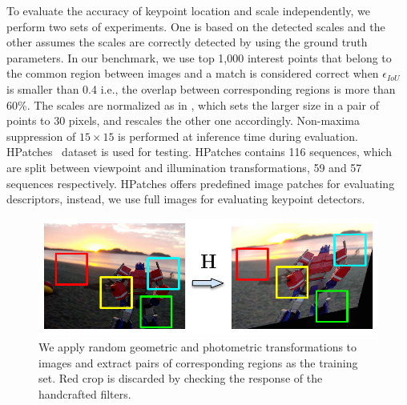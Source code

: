 To evaluate the accuracy of keypoint location and scale independently, we perform two sets of experiments. One is based on the detected scales and the other assumes the scales are correctly detected by using the ground truth parameters. 
In our benchmark, we use top 1,000 interest points that belong to the common region between images and a match is considered correct when $\epsilon_{IoU}$ is smaller than 0.4 i.e., the overlap between corresponding regions is more than 60\%. The scales are normalized as in \cite{Karel_Vedaldi_BMVC_18}, which sets the larger size in a pair of points to 30 pixels, and rescales the other one accordingly. Non-maxima suppression of $15 \times 15$ is performed at inference time during evaluation. HPatches~\cite{HPatches} dataset is used for testing. HPatches contains 116 sequences, which are split between viewpoint and illumination transformations, 59 and 57 sequences respectively. HPatches offers predefined image patches for evaluating descriptors, instead, we use full images for evaluating keypoint detectors. 

\begin{figure}[t]
 \hspace*{-0.1cm} 
 \vspace{-0.4cm}
    \centering
    \includegraphics[scale=0.75]{main/chapter02/figures/dataset_v3.pdf}
    \vspace{-0.0cm}
    \caption{We apply random geometric and photometric transformations to images and extract pairs of corresponding regions as the training set. 
    Red crop is discarded by checking the response of the handcrafted filters.
    }
    \label{fig:dataset}
\end{figure}    


